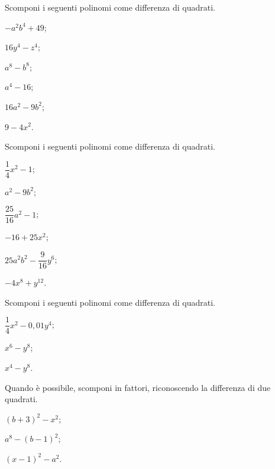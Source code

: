 \begin{multicols}{2}
\begin{esercizio}
\label{ese:16.32}
Scomponi i seguenti polinomi come differenza di quadrati.
\begin{enumeratea}
 \item $-a^{2}b^{4}+49$;
 \item $16y^{4}-z^{4}$;
 \item $a^{8}-b^{8}$;
 \item $a^{4}-16$;
 \item $16a^{2}-9b^{2}$;
 \item $9-4x^{2}$.
\end{enumeratea}
\end{esercizio}

\begin{esercizio}
\label{ese:16.33}
Scomponi i seguenti polinomi come differenza di quadrati.
\begin{enumeratea}
 \item $\dfrac{1}{4}x^{2}-1$;
 \item $a^{2}-9b^{2}$;
 \item $\dfrac{25}{16}a^{2}-1$;
 \item $-16+25x^{2}$;
 \item $25a^{2}b^{2}-\dfrac{9}{16}y^{6}$;
 \item $-4x^{8}+y^{12}$.
\end{enumeratea}
\end{esercizio}

\begin{esercizio}
\label{ese:16.34}
Scomponi i seguenti polinomi come differenza di quadrati.
\begin{enumeratea}
 \item $\dfrac{1}{4}x^{2}-0,01y^{4}$;
 \item $x^{6}-y^{8}$;
 \item $x^{4}-y^{8}$.
\end{enumeratea}
\end{esercizio}

\begin{esercizio}[\Ast]
\label{ese:16.35}
Quando è possibile, scomponi in fattori, riconoscendo la differenza di due quadrati.
\begin{enumeratea}
 \item $(b+3)^{2}-x^{2}$;
 \item $a^{8}-(b-1)^{2}$;
 \item $(x-1)^{2}-a^{2}$.
\end{enumeratea}
\end{esercizio}


\end{multicols}

